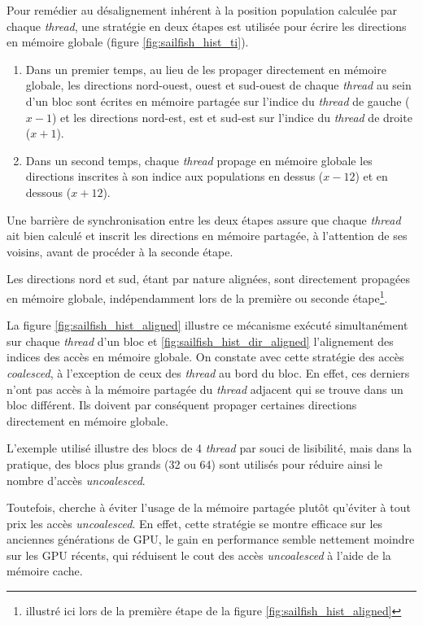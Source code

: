 Pour remédier au désalignement inhérent à la position population calculée par chaque \textit{thread}, une stratégie en deux étapes est utilisée pour écrire les directions en mémoire globale (figure \ref{fig:sailfish_hist_ti}). 
\begin{enumerate}
\item Dans un premier temps, au lieu de les propager directement en mémoire globale, les directions nord-ouest, ouest et sud-ouest de chaque \textit{thread} au sein d'un bloc sont écrites en mémoire partagée sur l'indice du \textit{thread} de gauche ($x-1$) et les directions nord-est, est et sud-est sur l'indice du \textit{thread} de droite ($x+1$).
\item Dans un second temps, chaque \textit{thread} propage en mémoire globale les directions inscrites à son indice aux populations en dessus ($x - 12$) et en dessous ($x + 12$).
\end{enumerate}
Une barrière de synchronisation entre les deux étapes assure que chaque \textit{thread} ait bien calculé et inscrit les directions en mémoire partagée, à l'attention de ses voisins, avant de procéder à la seconde étape.

Les directions nord et sud, étant par nature alignées, sont directement propagées en mémoire globale, indépendamment lors de la première ou seconde étape\footnote{illustré ici lors de la première étape de la figure \ref{fig:sailfish_hist_aligned}}. 

La figure \ref{fig:sailfish_hist_aligned} illustre ce mécanisme exécuté simultanément sur chaque \textit{thread} d'un bloc et \ref{fig:sailfish_hist_dir_aligned} l'alignement des indices des accès en mémoire globale. On constate avec cette stratégie des accès \textit{coalesced}, à l'exception de ceux des \textit{thread} au bord du bloc. En effet, ces derniers n'ont pas accès à la mémoire partagée du \textit{thread} adjacent qui se trouve dans un bloc différent. Ils doivent par conséquent propager certaines directions directement en mémoire globale.

L'exemple utilisé illustre des blocs de 4 \textit{thread} par souci de lisibilité, mais dans la pratique, des blocs plus grands (32 ou 64) sont utilisés pour réduire ainsi le nombre d'accès \textit{uncoalesced}.

Toutefois, \cite{obrecht_global_2011} cherche à éviter l'usage de la mémoire partagée plutôt qu'éviter à tout prix les accès \textit{uncoalesced}. En effet, cette stratégie se montre efficace sur les anciennes générations de \acs{GPU}, le gain en performance semble nettement moindre sur les \acs{GPU} récents, qui réduisent le cout des accès \textit{uncoalesced} à l'aide de la mémoire cache. 


